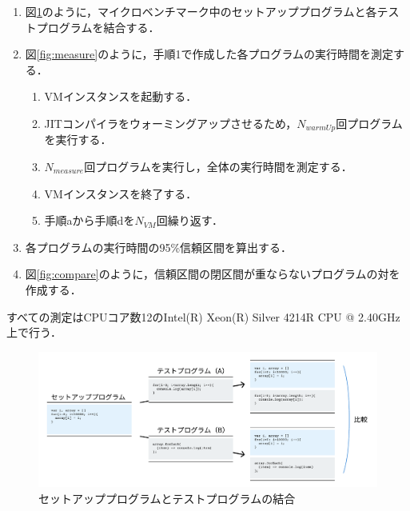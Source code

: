 \documentclass[11pt]{jreport}
\newcommand{\fix}[1]{#1}
\begin{document}
\begin{enumerate}
    \item 図\ref{fig:concat}のように，マイクロベンチマーク中のセットアッププログラムと各テストプログラムを結合する．
    \item 図\ref{fig:measure}のように，手順1で作成した各プログラムの実行時間を測定する．
    \begin{enumerate}
        \item \fix{VM}インスタンスを起動する．
        \item JITコンパイラをウォーミングアップさせるため，\begin{math}N_{warmUp}\end{math}回プログラムを実行する．
        \item \begin{math}N_{measure}\end{math}回プログラムを実行し，全体の実行時間を測定する．
        \item \fix{VM}インスタンスを終了する．
        \item 手順aから手順dを\fix{\begin{math}N_{VM}\end{math}}回繰り返す．
    \end{enumerate}
    \item 各プログラムの実行時間の95\%信頼区間を算出する．
    \item 図\ref{fig:compare}のように，信頼区間の閉区間が重ならないプログラムの対を作成する．
\end{enumerate}


すべての測定はCPUコア数12のIntel(R) Xeon(R) Silver 4214R CPU @ 2.40GHz上で行う．


\begin{figure}[t]
\centerline{\includegraphics[width=0.96\linewidth]{Omori_fig/concat.pdf}}
\caption{セットアッププログラムとテストプログラムの結合}
\label{fig:concat}
\end{figure}
\end{document}
